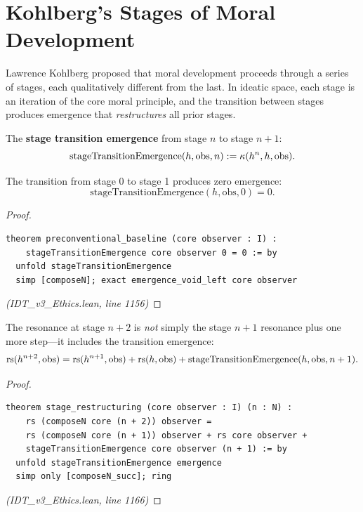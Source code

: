 \section{Kohlberg's Stages of Moral Development}
\label{sec:kohlberg}

Lawrence Kohlberg proposed that moral development proceeds through a series
of stages, each qualitatively different from the last. In ideatic space,
each stage is an iteration of the core moral principle, and the transition
between stages produces emergence that \emph{restructures} all prior stages.

\begin{definition}
\label{def:stage-transition}
The \textbf{stage transition emergence} from stage $n$ to stage $n+1$:
\[
  \mathrm{stageTransitionEmergence}(h, \mathrm{obs}, n) := \kappa(h^n, h, \mathrm{obs}).
\]
\end{definition}

\begin{theorem}
\label{thm:preconventional}
The transition from stage 0 to stage 1 produces zero emergence:
\[
  \mathrm{stageTransitionEmergence}(h, \mathrm{obs}, 0) = 0.
\]
\end{theorem}

\begin{proof}
\begin{lstlisting}
theorem preconventional_baseline (core observer : I) :
    stageTransitionEmergence core observer 0 = 0 := by
  unfold stageTransitionEmergence
  simp [composeN]; exact emergence_void_left core observer
\end{lstlisting}
\textit{(IDT\_v3\_Ethics.lean, line 1156)}
\end{proof}

\begin{theorem}
\label{thm:stage-restructuring}
The resonance at stage $n+2$ is \emph{not} simply the stage $n+1$ resonance
plus one more step---it includes the transition emergence:
\[
  \mathrm{rs}(h^{n+2}, \mathrm{obs}) = \mathrm{rs}(h^{n+1}, \mathrm{obs}) + \mathrm{rs}(h, \mathrm{obs})
  + \mathrm{stageTransitionEmergence}(h, \mathrm{obs}, n+1).
\]
\end{theorem}

\begin{proof}
\begin{lstlisting}
theorem stage_restructuring (core observer : I) (n : N) :
    rs (composeN core (n + 2)) observer =
    rs (composeN core (n + 1)) observer + rs core observer +
    stageTransitionEmergence core observer (n + 1) := by
  unfold stageTransitionEmergence emergence
  simp only [composeN_succ]; ring
\end{lstlisting}
\textit{(IDT\_v3\_Ethics.lean, line 1166)}
\end{proof}

